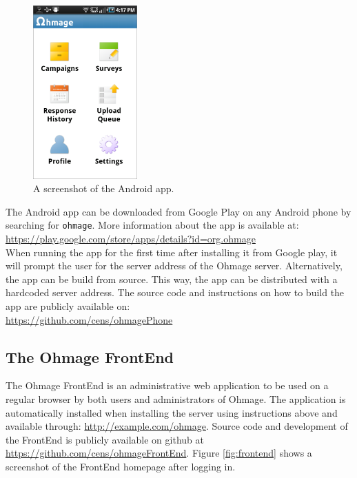 \documentclass{scrartcl}
\begin{document}
\begin{figure}[h!]
\begin{center}
\includegraphics[width=4cm]{app.png}
\caption{A screenshot of the Android app.}
\label{fig:phone}
\end{center}
\end{figure}

\noindent The Android app can be downloaded from Google Play on any
Android phone by searching for \texttt{ohmage}. More information about the
app is available at: \\

\url{https://play.google.com/store/apps/details?id=org.ohmage} \\

When running the app for the first time after installing it from Google play, it
will prompt the user for the server address of the Ohmage server.
Alternatively, the app can be build from source. This way, the app can be
distributed with a hardcoded server address. The source code and instructions on
how to build the app are publicly available on: \\

\url{https://github.com/cens/ohmagePhone} \\

\subsection{The Ohmage FrontEnd}

The Ohmage FrontEnd is an administrative web application to be used on a regular
browser by both users and administrators of Ohmage. The application is
automatically installed when installing the server using instructions above and
available through: \url{http://example.com/ohmage}. Source code and
development of the FrontEnd is publicly available on github at
\url{https://github.com/cens/ohmageFrontEnd}. Figure \ref{fig:frontend} shows a
screenshot of the FrontEnd homepage after logging in. \\
\end{document}
